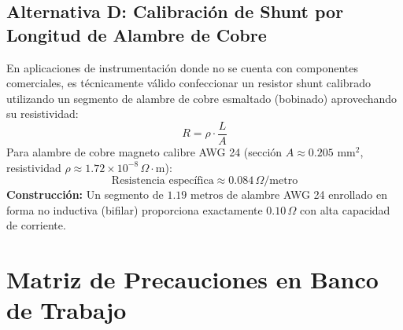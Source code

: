\documentclass[11pt, a4paper]{article}
\begin{document}
\subsection*{Alternativa D: Calibración de Shunt por Longitud de Alambre de Cobre}
En aplicaciones de instrumentación donde no se cuenta con componentes comerciales, es técnicamente válido confeccionar un resistor shunt calibrado utilizando un segmento de alambre de cobre esmaltado (bobinado) aprovechando su resistividad:
\begin{equation}
    R = \rho \cdot \frac{L}{A}
\end{equation}
Para alambre de cobre magneto calibre AWG 24 (sección $A \approx 0.205\text{ mm}^2$, resistividad $\rho \approx 1.72 \times 10^{-8}\,\Omega\cdot\text{m}$):
\begin{equation*}
    \text{Resistencia específica} \approx 0.084\,\Omega/\text{metro}
\end{equation*}
\textbf{Construcción:} Un segmento de $1.19\text{ metros}$ de alambre AWG 24 enrollado en forma no inductiva (bifilar) proporciona exactamente $0.10\,\Omega$ con alta capacidad de corriente.

\section{Matriz de Precauciones en Banco de Trabajo}
\end{document}
